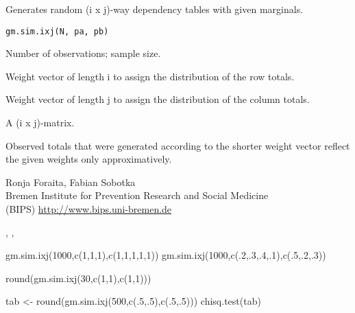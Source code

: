 \begin{Description}\relax
Generates random (i x j)-way dependency tables with given marginals.
\end{Description}
\begin{Usage}
\begin{verbatim}
gm.sim.ixj(N, pa, pb)
\end{verbatim}
\end{Usage}
\begin{Arguments}
\begin{ldescription}
\item[\code{N}] Number of observations; sample size. 
\item[\code{pa}] Weight vector of length i to assign the distribution of the row totals. 
\item[\code{pb}] Weight vector of length j to assign the distribution of the column totals. 
\end{ldescription}
\end{Arguments}
\begin{Value}
A (i x j)-matrix.
\end{Value}
\begin{Note}\relax
Observed totals that were generated according to the shorter weight vector 
reflect the given weights only approximatively.
\end{Note}
\begin{Author}\relax
Ronja Foraita, Fabian Sobotka \\
Bremen Institute for Prevention Research and Social Medicine \\
(BIPS)  \url{http://www.bips.uni-bremen.de}
\end{Author}
\begin{SeeAlso}\relax
{}, , 
\end{SeeAlso}
\begin{Examples}
\begin{ExampleCode}
    gm.sim.ixj(1000,c(1,1,1),c(1,1,1,1,1))
    gm.sim.ixj(1000,c(.2,.3,.4,.1),c(.5,.2,.3)) 
    
    round(gm.sim.ixj(30,c(1,1),c(1,1)))       
    
    tab <- round(gm.sim.ixj(500,c(.5,.5),c(.5,.5)))
    chisq.test(tab)   
\end{ExampleCode}
\end{Examples}

